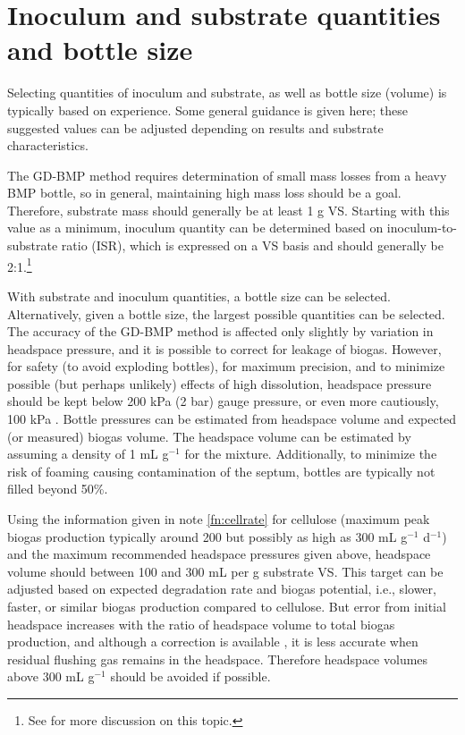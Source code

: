 \documentclass[]{article}
\begin{document}
\section{Inoculum and substrate quantities and bottle size}
\label{sec:quantities}
Selecting quantities of inoculum and substrate, as well as bottle size (volume) is typically based on experience.
Some general guidance is given here; these suggested values can be adjusted depending on results and substrate characteristics.

The GD-BMP method requires determination of small mass losses from a heavy BMP bottle, so in general, maintaining high mass loss should be a goal.
Therefore, substrate mass should generally be at least 1 g VS.
Starting with this value as a minimum, inoculum quantity can be determined based on inoculum-to-substrate ratio (ISR), which is expressed on a VS basis and should generally be 2:1.\footnote{See \citet{holligerStandardizationBiomethanePotential2016} for more discussion on this topic.}

With substrate and inoculum quantities, a bottle size can be selected.
Alternatively, given a bottle size, the largest possible quantities can be selected.
The accuracy of the GD-BMP method is affected only slightly by variation in headspace pressure, and it is possible to correct for leakage of biogas. 
However, for safety (to avoid exploding bottles), for maximum precision, and to minimize possible (but perhaps unlikely) effects of high  dissolution, headspace pressure should be kept below 200 kPa (2 bar) gauge pressure, or even more cautiously, 100 kPa \citep{hafnerSystematicErrorManometric2019}. 
Bottle pressures can be estimated from headspace volume and expected (or measured) biogas volume.
The headspace volume can be estimated by assuming a density of 1 mL g$^{-1}$ for the mixture.
Additionally, to minimize the risk of foaming causing contamination of the septum, bottles are typically not filled beyond 50\%.

Using the information given in note \ref{fn:cellrate} for cellulose (maximum peak biogas production typically around 200 but possibly as high as 300 mL g$^{-1}$ d$^{-1}$) and the maximum recommended headspace pressures given above, headspace volume should between 100 and 300 mL per g substrate VS.
This target can be adjusted based on expected degradation rate and biogas potential, i.e., slower, faster, or similar biogas production compared to cellulose.
But error from initial headspace increases with the ratio of headspace volume to total biogas production, and although a correction is available \citep{justesenDevelopmentValidationLowcost2019}, it is less accurate when residual flushing gas remains in the headspace.
Therefore headspace volumes above 300 mL g$^{-1}$ should be avoided if possible.
\end{document}
